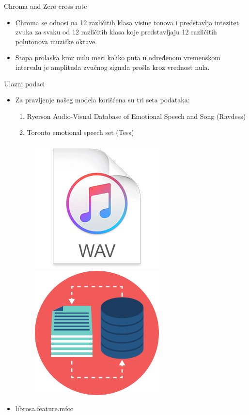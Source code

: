 \documentclass{beamer}
\begin{document}
\begin{frame}{Chroma and Zero cross rate}
\begin{itemize}
    \item Chroma se odnosi na 12 različitih klasa visine tonova i predstavlja intezitet zvuka za svaku od 12 različitih klasa koje predstavljaju 12 različitih polutonova muzičke oktave. 
    \item Stopa prolaska kroz nulu meri koliko puta u određenom vremenskom intervalu je amplituda zvučnog signala prošla kroz vrednost nula.
\end{itemize}
\end{frame}

\begin{frame}{Ulazni podaci}
\begin{itemize}
    \item Za pravljenje našeg modela korišćena su tri seta podataka: 
    \begin{enumerate}
    \item Ryerson Audio-Visual Database of Emotional Speech and Song (Ravdess)
    \item Toronto emotional speech set (Tess)
    \end{enumerate}
    \begin{figure}[h]
    \centering
    \includegraphics[scale=0.4]{im3.png}
    \includegraphics[scale=0.2]{im2.png}
    \end{figure}
    \item librosa.feature.mfcc
\end{itemize}
\end{frame}
\end{document}
